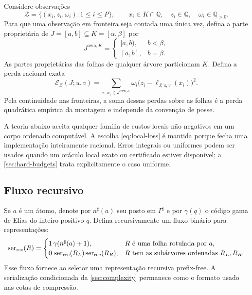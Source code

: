 \documentclass[11pt,a4paper]{article}
\theoremstyle{definition}
\theoremstyle{remark}
\newcommand{\own}{\mathrm{own}}
\newcommand{\ser}{\operatorname{ser}}
\newcommand{\loss}{\mathcal{E}}
\begin{document}
Considere observações
\begin{equation}
 \mathcal Z=\{(x_i,z_i,\omega_i):1\le i\le P\},
 \qquad
 x_i\in K\cap\mathbb Q,\quad z_i\in\mathbb Q,\quad
 \omega_i\in\mathbb Q_{>0}.
 \label{eq:rational-data}
\end{equation}
Para que uma observação em fronteira seja contada uma única vez, defina a
parte proprietária de $J=[a,b]\subseteq K=[\alpha,\beta]$ por
\begin{equation}
 J^{\own,K}=
 \begin{cases}
 [a,b),&b<\beta,\\
 [a,b],&b=\beta.
 \end{cases}
 \label{eq:relative-ownership}
\end{equation}
As partes proprietárias das folhas de qualquer árvore particionam $K$.
Defina a perda racional exata
\begin{equation}
 \loss_{\mathcal Z}(J;u,v)
 =\sum_{i:\,x_i\in J^{\own,K}}
 \omega_i\bigl(z_i-\ell_{J;u,v}(x_i)\bigr)^2.
 \label{eq:local-loss}
\end{equation}
Pela continuidade nas fronteiras, a soma dessas perdas sobre as folhas é a
perda quadrática empírica da montagem e independe da convenção de posse.

A teoria abaixo aceita qualquer família de custos locais não negativos em um
corpo ordenado computável. A escolha \eqref{eq:local-loss} é mantida porque
fecha uma implementação inteiramente racional. Erros integrais ou uniformes
podem ser usados quando um oráculo local exato ou certificado estiver
disponível; a \cref{sec:hard-budgets} trata explicitamente o caso uniforme.

\subsection{Fluxo recursivo}

Se $a$ é um átomo, denote por $n^\sharp(a)$ seu posto em $\Gamma^\sharp$ e
por $\gamma(q)$ o código gama de Elias do inteiro positivo $q$. Defina
recursivamente um fluxo binário para representações:
\begin{equation}
 \ser_{\rm rec}(R)=
 \begin{cases}
 1\,\gamma(n^\sharp(a)+1),&R\text{ é uma folha rotulada por }a,\\
 0\,\ser_{\rm rec}(R_L)\ser_{\rm rec}(R_R),
 &R\text{ tem as subárvores ordenadas }R_L,R_R.
 \end{cases}
 \label{eq:recursive-stream}
\end{equation}
Esse fluxo fornece ao seletor uma representação recursiva prefix-free. A
serialização condicionada da \cref{sec:complexity} permanece como o formato
usado nas cotas de compressão.
\end{document}
